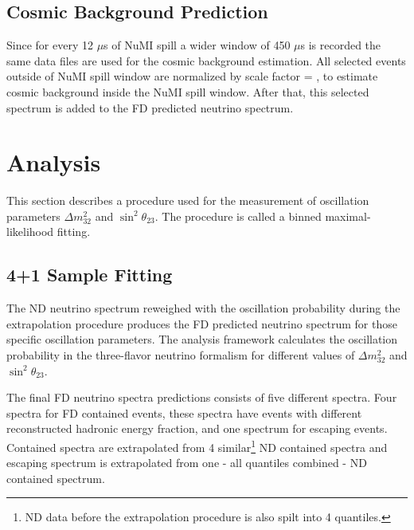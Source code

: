 \subsection{Cosmic Background Prediction}
Since for every 12 $\mu$s of NuMI spill a wider window of 450 $\mu$s is recorded the same data files
are used for the cosmic background estimation. All selected events outside of NuMI spill window are 
normalized by scale factor 
\be
{} = ,
\ee
to estimate cosmic background inside the NuMI spill window. After that, this selected spectrum is added 
to the FD predicted neutrino spectrum.

\section{Analysis}
This section describes a procedure used for the measurement of oscillation parameters $\Delta m^2_{32}$ 
and $\sin^2\theta_{23}$. The procedure is called a binned maximal-likelihood fitting.

\subsection{4+1 Sample Fitting}
The ND neutrino spectrum reweighed with the oscillation probability during the extrapolation procedure 
produces the FD predicted neutrino spectrum for those specific oscillation parameters. 
The analysis framework calculates the oscillation probability in the three-flavor neutrino formalism for 
different values of  $\Delta m^2_{32}$ and $\sin^2\theta_{23}$. 

The final FD neutrino spectra predictions consists of five different spectra. Four spectra for FD contained
events, these spectra have events with different reconstructed hadronic energy fraction, and one spectrum
for escaping events. Contained spectra are extrapolated from 4 similar\footnote{ND data before the extrapolation
procedure is also spilt into 4 quantiles.} ND contained spectra and escaping spectrum is extrapolated from 
one - all quantiles combined - ND contained spectrum.

